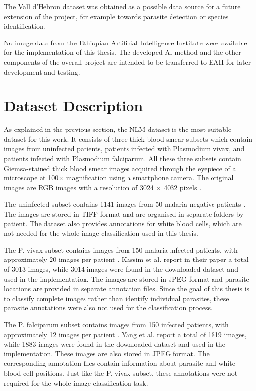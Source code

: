 The Vall d'Hebron dataset was obtained as a possible data source for a future extension of the project, for example towards parasite detection or species identification.

No image data from the Ethiopian Artificial Intelligence Institute were available for the implementation of this thesis. The developed AI method and the other components of the overall project are intended to be transferred to EAII for later development and testing.

\section{Dataset Description}
\label{sec:dataset-description}

As explained in the previous section, the NLM dataset is the most suitable dataset for this work. It consists of three thick blood smear subsets which contain images from uninfected patients, patients infected with Plasmodium vivax, and patients infected with Plasmodium falciparum. All these three subsets contain Giemsa-stained thick blood smear images acquired through the eyepiece of a microscope at 100$\times$ magnification using a smartphone camera. The original images are RGB images with a resolution of 3024 $\times$ 4032 pixels \cite{Yang2020,Kassim2021}.

The uninfected subset contains 1141 images from 50 malaria-negative patients \cite{Kassim2021}. The images are stored in TIFF format and are organised in separate folders by patient. The dataset also provides annotations for white blood cells, which are not needed for the whole-image classification used in this thesis.

 The P. vivax subset contains images from 150 malaria-infected patients, with approximately 20 images per patient \cite{Kassim2021}. Kassim et al. report in their paper a total of 3013 images, while 3014 images were found in the downloaded dataset and used in the implementation. The images are stored in JPEG format and parasite locations are provided in separate annotation files. Since the goal of this thesis is to classify complete images rather than identify individual parasites, these parasite annotations were also not used for the classification process.

The P. falciparum subset contains images from 150 infected patients, with approximately 12 images per patient \cite{Yang2020}. Yang et al. report a total of 1819 images, while 1883 images were found in the downloaded dataset and used in the implementation. These images are also stored in JPEG format. The corresponding annotation files contain information about parasite and white blood cell positions. Just like the P. vivax subset, these annotations were not required for the whole-image classification task.

